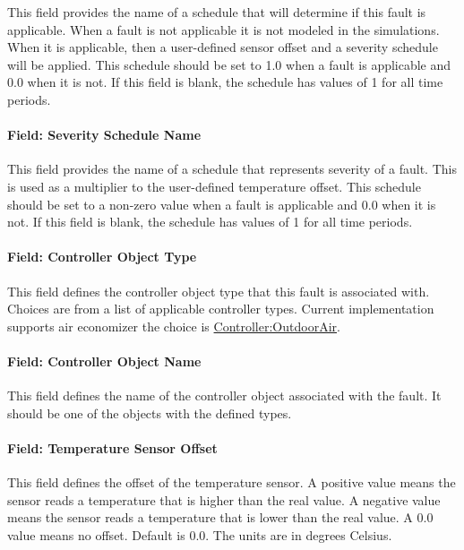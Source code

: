 This field provides the name of a schedule that will determine if this fault is applicable. When a fault is not applicable it is not modeled in the simulations. When it is applicable, then a user-defined sensor offset and a severity schedule will be applied. This schedule should be set to 1.0 when a fault is applicable and 0.0 when it is not. If this field is blank, the schedule has values of 1 for all time periods.

\paragraph{Field: Severity Schedule Name}\label{field-severity-schedule-name-3}

This field provides the name of a schedule that represents severity of a fault. This is used as a multiplier to the user-defined temperature offset. This schedule should be set to a non-zero value when a fault is applicable and 0.0 when it is not. If this field is blank, the schedule has values of 1 for all time periods.

\paragraph{Field: Controller Object Type}\label{field-controller-object-type-3}

This field defines the controller object type that this fault is associated with. Choices are from a list of applicable controller types. Current implementation supports air economizer the choice is \hyperref[controlleroutdoorair]{Controller:OutdoorAir}.

\paragraph{Field: Controller Object Name}\label{field-controller-object-name-3}

This field defines the name of the controller object associated with the fault. It should be one of the objects with the defined types.

\paragraph{Field: Temperature Sensor Offset}\label{field-temperature-sensor-offset-1}

This field defines the offset of the temperature sensor. A positive value means the sensor reads a temperature that is higher than the real value. A negative value means the sensor reads a temperature that is lower than the real value. A 0.0 value means no offset. Default is 0.0. The units are in degrees Celsius.

